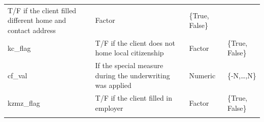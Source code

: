 \documentclass[
]{article}
\begin{document}
\begin{longtable}[]{@{}llll@{}}
\begin{minipage}[t]{0.30\columnwidth}
T/F if the client filled different home and contact address\strut
\end{minipage} & \begin{minipage}[t]{0.11\columnwidth}\raggedright
Factor\strut
\end{minipage} & \begin{minipage}[t]{0.19\columnwidth}\raggedright
\{True, False\}\strut
\end{minipage}\tabularnewline
\begin{minipage}[t]{0.30\columnwidth}\raggedright
kc\_flag\strut
\end{minipage} & \begin{minipage}[t]{0.30\columnwidth}\raggedright
T/F if the client does not home local citizenship\strut
\end{minipage} & \begin{minipage}[t]{0.11\columnwidth}\raggedright
Factor\strut
\end{minipage} & \begin{minipage}[t]{0.19\columnwidth}\raggedright
\{True, False\}\strut
\end{minipage}\tabularnewline
\begin{minipage}[t]{0.30\columnwidth}\raggedright
cf\_val\strut
\end{minipage} & \begin{minipage}[t]{0.30\columnwidth}\raggedright
If the special measure during the underwriting was applied\strut
\end{minipage} & \begin{minipage}[t]{0.11\columnwidth}\raggedright
Numeric\strut
\end{minipage} & \begin{minipage}[t]{0.19\columnwidth}\raggedright
\{-N,\ldots,N\}\strut
\end{minipage}\tabularnewline
\begin{minipage}[t]{0.30\columnwidth}\raggedright
kzmz\_flag\strut
\end{minipage} & \begin{minipage}[t]{0.30\columnwidth}\raggedright
T/F if the client filled in employer\strut
\end{minipage} & \begin{minipage}[t]{0.11\columnwidth}\raggedright
Factor\strut
\end{minipage} & \begin{minipage}[t]{0.19\columnwidth}\raggedright
\{True, False\}\strut
\end{minipage}\tabularnewline
\begin{minipage}[t]{0.30\columnwidth}\raggedright

\end{minipage}
\end{longtable}
\end{document}
